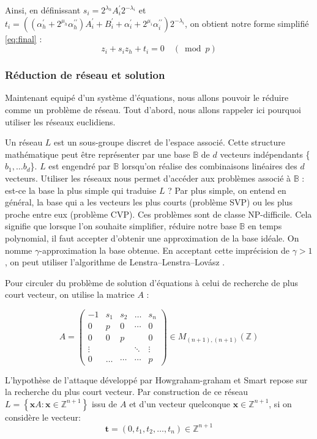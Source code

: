 \documentclass{backend}
\begin{document}
Ainsi, en définissant $s_{i} = 2^{\lambda_{h}} A^{\prime}_{i}2^{-\lambda_{i}}$ et $ t_{i} =  ((\alpha_{h}^{\prime}+2^{\mu_{h}} \alpha_{h}^{\prime \prime})A^{\prime}_{i} + B^{\prime}_{i}+\alpha_{i}^{\prime}+2^{\mu_{i}} \alpha_{i}^{\prime \prime}) 2^{-\lambda_{i}}$, on obtient notre forme simplifié \ref{eq:final} :
$$  z_{i}+s_{i} z_{h}+t_{i} = 0 \quad(\bmod p)$$


\subsubsection{Réduction de réseau et solution}

Maintenant equipé d'un système d'équations, nous allons pouvoir le réduire comme un problème de réseau. Tout d'abord, nous allons rappeler ici pourquoi utiliser les réseaux euclidiens.


Un réseau $L$ est un sous-groupe discret de l'espace associé. Cette structure mathématique peut être représenter par une base $\mathbb{B}$ de $d$ vecteurs indépendants \{$b_1, \dots b_d$\}. $L$ est engendré par $\mathbb{B}$ lorsqu'on réalise des combinaisons linéaires des $d$ vecteurs. Utiliser les réseaux nous permet d'accéder aux problèmes associé à $\mathbb{B}$ : est-ce la base la plus simple qui traduise $L$ ? Par plus simple, on entend en général, la base qui a les vecteurs les plus courts (problème SVP) ou les plus proche entre eux (problème CVP). Ces problèmes sont de classe NP-difficile. Cela signifie que lorsque l'on souhaite simplifier, réduire notre base $\mathbb{B}$ en temps polynomial, il faut accepter d'obtenir une approximation de la base idéale. On nomme $\gamma$-approximation la base obtenue. En acceptant cette imprécision de $\gamma>1$ , on peut utiliser l'algorithme de Lenstra–Lenstra–Lovász \cite{lll}.
\medbreak

Pour circuler du problème de solution d'équations à celui de recherche de plus court vecteur, on utilise la matrice $A$ :

$$
A=\left(\begin{array}{ccccc}
-1 & s_{1} & s_{2} & \ldots & s_{n} \\
0 & p & 0 & \cdots & 0 \\
0 & 0 & p & & 0 \\
\vdots & & & \ddots & \vdots \\
0 & \ldots & \cdots & \cdots & p
\end{array}\right) \in M_{(n+1),(n+1)}(\mathbb{Z})
$$

L'hypothèse de l'attaque développé par Howgraham-graham et Smart \cite{latAtk} repose sur la recherche du plus court vecteur. Par construction de ce réseau $L=\left\{\mathbf{x} A: \mathbf{x} \in \mathbb{Z}^{n+1}\right\}$ issu de $A$ et d'un vecteur quelconque $\mathbf{x} \in \mathbb{Z}^{n+1}$, si on considère le vecteur:
$$
\mathbf{t}=\left(0, t_{1}, t_{2}, \ldots, t_{n}\right) \in \mathbb{Z}^{n+1}
$$
\end{document}
